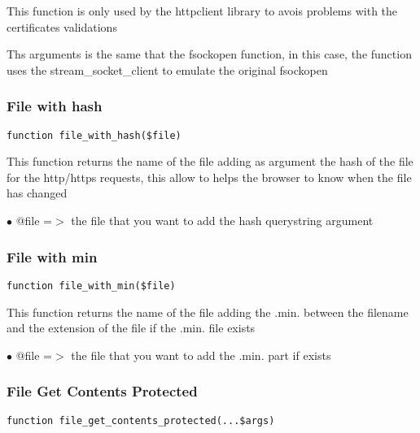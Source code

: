 \documentclass[a4paper]{article}
\begin{document}
This function is only used by the httpclient library to avois problems with
the certificates validations

Ths arguments is the same that the fsockopen function, in this case, the
function uses the stream\_socket\_client to emulate the original fsockopen

\hypertarget{toc141}{}
\subsubsection{File with hash}

\begin{lstlisting}
function file_with_hash($file)
\end{lstlisting}

This function returns the name of the file adding as argument the hash
of the file for the http/https requests, this allow to helps the browser
to know when the file has changed

\begin{compactitem}
\item[\color{myblue}$\bullet$] @file =$>$ the file that you want to add the hash querystring argument
\end{compactitem}

\hypertarget{toc142}{}
\subsubsection{File with min}

\begin{lstlisting}
function file_with_min($file)
\end{lstlisting}

This function returns the name of the file adding the .min. between the
filename and the extension of the file if the .min. file exists

\begin{compactitem}
\item[\color{myblue}$\bullet$] @file =$>$ the file that you want to add the .min. part if exists
\end{compactitem}

\hypertarget{toc143}{}
\subsubsection{File Get Contents Protected}

\begin{lstlisting}
function file_get_contents_protected(...$args)
\end{lstlisting}
\end{document}
